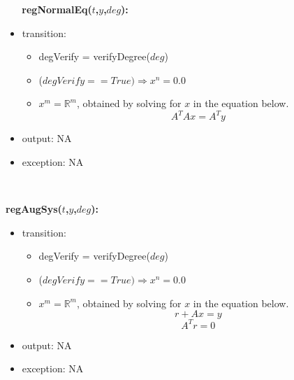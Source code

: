 \documentclass[12pt, titlepage]{article}
\begin{document}
~\newline
~\newline
\noindent \textbf{regNormalEq($t$,$y$,$deg$):}
\begin{itemize}
	\item transition: 
	\begin{itemize}
		\item degVerify = verifyDegree($deg$)
		\item ($degVerify == True) \Longrightarrow  x ^ n = 0.0$ 
		\item $x ^ m = \mathbb{R}^m$, obtained by solving for $x$ in the 
		equation below.
		\begin{equation*}
		A^{T} Ax = A^{T}y
		\end{equation*}  
	\end{itemize} 
	\item output: NA
	\item exception: NA
\end{itemize}

~\newline
~\newline

\noindent \textbf{regAugSys($t$,$y$,$deg$):}
\begin{itemize}
\item transition: 
\begin{itemize}
	\item degVerify = verifyDegree($deg$)
	\item ($degVerify == True) \Longrightarrow  x ^ n = 0.0$ 
	\item $x ^ m = \mathbb{R}^m$, obtained by solving for $x$ in the 
	equation below.
		\begin{equation*}
		r + Ax = y
		\end{equation*}
		\begin{equation*}
		A^{T} r = 0
		\end{equation*}
	\end{itemize}	
	\item output: NA 
		
	\item exception: NA
\end{itemize}
\end{document}
